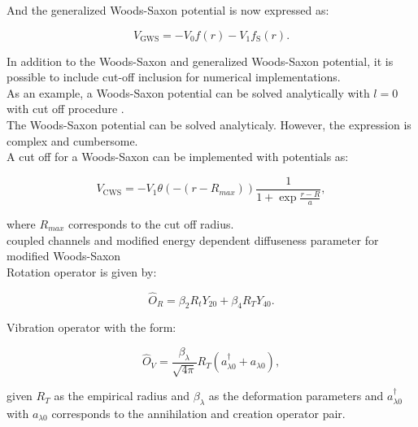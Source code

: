 \documentclass[openany]{book}
\begin{document}
And the generalized Woods-Saxon potential is now expressed as: 

\begin{equation} \label{eq:potential_GeneralWoodsSaxon}
	V_{\mathrm{GWS}} = -V_0 f(r) - V_1 	f_{\mathrm{S}}(r).
\end{equation}

In addition to the Woods-Saxon and generalized Woods-Saxon potential, it is possible to include cut-off inclusion for numerical implementations. \\

As an example, a Woods-Saxon potential can be solved analytically with $l = 0$ with cut off procedure \cite{salamon_baran_vertse_2016}. \\

The Woods-Saxon potential can be solved analyticaly. However, the expression is complex and cumbersome. \\

A cut off for a Woods-Saxon can be implemented with potentials as:

\begin{equation}\label{eq:potential_woodsSaxon_cutOFF}
	V_{\mathrm{CWS}} = - V_1 \theta(- (r- R_{max})) \frac{1}{1 + \exp {\frac{r - R}{a}}},
\end{equation}

where $R_{max}$ corresponds to the cut off radius.\\

coupled channels and modified energy dependent diffuseness parameter for modified Woods-Saxon \cite{singh_sukhvinder_kharab_2013A} \\

Rotation operator is given by: 

\begin{equation}\label{eq:potential_rotation}
	\hat {O}_R = \beta_2R_tY_{20} + \beta_4 R_T Y_{40}.
\end{equation}

Vibration operator with the form: 

\begin{equation}\label{eq:potential_vibration}
	\hat {O}_V = \frac{\beta_\lambda}{\sqrt{4\pi}} R_T (a^\dagger_{\lambda0} + a_{\lambda0}),
\end{equation}

given $R_T$ as the empirical radius and $\beta_\lambda$ as the deformation parameters and  $a^\dagger_{\lambda0}$ with $a_{\lambda0}$ corresponds to the annihilation and creation operator pair.  \\
\end{document}
